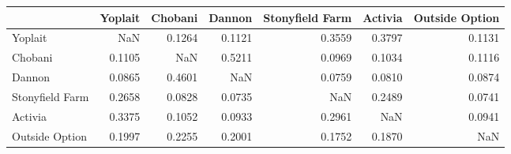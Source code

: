 \begin{tabular}{lrrrrrr}
\toprule
 & Yoplait & Chobani & Dannon & Stonyfield Farm & Activia & Outside Option \\
\midrule
Yoplait & NaN & 0.1264 & 0.1121 & 0.3559 & 0.3797 & 0.1131 \\
Chobani & 0.1105 & NaN & 0.5211 & 0.0969 & 0.1034 & 0.1116 \\
Dannon & 0.0865 & 0.4601 & NaN & 0.0759 & 0.0810 & 0.0874 \\
Stonyfield Farm & 0.2658 & 0.0828 & 0.0735 & NaN & 0.2489 & 0.0741 \\
Activia & 0.3375 & 0.1052 & 0.0933 & 0.2961 & NaN & 0.0941 \\
Outside Option & 0.1997 & 0.2255 & 0.2001 & 0.1752 & 0.1870 & NaN \\
\bottomrule
\end{tabular}